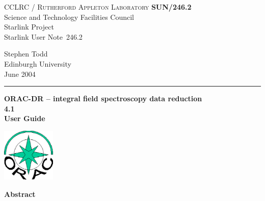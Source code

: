 \documentclass[twoside,11pt]{article}
\newcommand{\stardoccategory}  {Starlink User Note}
\newcommand{\stardocinitials}  {SUN}
\newcommand{\stardocnumber}    {246.2}
\newcommand{\stardocauthors}   {Stephen Todd \\
                                Edinburgh University}
\newcommand{\stardocdate}      {June 2004}
\newcommand{\stardoctitle}     {ORAC-DR -- integral field spectroscopy
  data reduction}
\newcommand{\stardocversion}   {4.1}
\newcommand{\stardocmanual}    {User Guide}
\newcommand{\stardocname}{\stardocinitials /\stardocnumber}
\newenvironment{latexonly}{}{}
\renewcommand{\_}{\texttt{\symbol{95}}}
\begin{document}
\setcounter{secnumdepth}{5}
\thispagestyle{empty}

\begin{latexonly}
   CCLRC / \textsc{Rutherford Appleton Laboratory} \hfill \textbf{\stardocname}\\
   {\large Science and Technology Facilities Council}\\
   {\large Starlink Project\\ }
   {\large \stardoccategory\ \stardocnumber}
   \begin{flushright}
   \stardocauthors\\
   \stardocdate
   \end{flushright}
   \vspace{-4mm}
   \rule{\textwidth}{0.5mm}
   \vspace{5mm}
   \begin{center}
   {\Huge\textbf{\stardoctitle \\ [2.5ex]}}
   {\LARGE\textbf{\stardocversion \\ [4ex]}}
   {\Huge\textbf{\stardocmanual}}
   \end{center}
   \vspace{5mm}

\begin{center}
\includegraphics[width=1.0in]{sun246_logo.eps}
\end{center}

   \vspace{10mm}
   \begin{center}
      {\Large\textbf{Abstract}}
   \end{center}
\end{latexonly}
\end{document}
